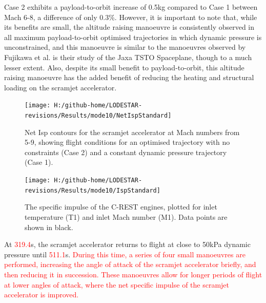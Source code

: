 Case 2 exhibits a payload-to-orbit increase of 0.5kg compared to Case 1 between Mach 6-8, a difference of only 0.3\%.
However, it is important to note that, while its benefits are small, the altitude raising manoeuvre is consistently observed in all maximum payload-to-orbit optimised trajectories in which dynamic pressure is unconstrained, and this manoeuvre is similar to the manoeuvres observed by Fujikawa et al.\cite{Fujikawa2017} is their study of the Jaxa TSTO Spaceplane, though to a much lesser extent. 
Also, despite its small benefit to payload-to-orbit, this altitude raising manoeuvre has the added benefit of reducing the heating and structural loading on the scramjet accelerator. 





\begin{figure}[ht!]%
	\centering
	\texttt{[image: H:/github-home/LODESTAR-revisions/Results/mode10/NetIspStandard]}
	\caption{Net Isp contours for the scramjet accelerator at Mach numbers from 5-9, showing flight conditions for an optimised trajectory with no constraints (Case 2) and a constant dynamic pressure trajectory (Case 1). }
	\label{fig:NetIspStandardNoReturn}
\end{figure}

\begin{figure}[ht!]%
	\centering
	\texttt{[image: H:/github-home/LODESTAR-revisions/Results/mode10/IspStandard]}
	\caption{The specific impulse of the C-REST engines, plotted for inlet temperature (T1) and inlet Mach number (M1). Data points are shown in black. }
	\label{fig:IspStandard}
\end{figure}


At \textcolor{red}{319.4}s, the scramjet accelerator returns to flight at close to 50kPa dynamic pressure until \textcolor{red}{511.1}s. \textcolor{red}{During this time, a series of four small manoeuvres are performed, increasing the angle of attack of the scramjet accelerator briefly, and then reducing it in succession. These manoeuvres allow for longer periods of flight at lower angles of attack, where the net specific impulse of the scramjet accelerator is improved. }
 
